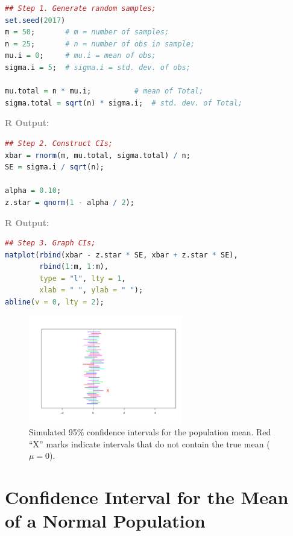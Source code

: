 \begin{lstlisting}[language=R]
## Step 1. Generate random samples;
set.seed(2017)
m = 50;       # m = number of samples;
n = 25;       # n = number of obs in sample;
mu.i = 0;     # mu.i = mean of obs;
sigma.i = 5;  # sigma.i = std. dev. of obs;

mu.total = n * mu.i;          # mean of Total;
sigma.total = sqrt(n) * sigma.i;  # std. dev. of Total;
\end{lstlisting}

\vspace{1em}
\textcolor{gray}{\textbf{R Output:}}

\begin{lstlisting}[language=R]
## Step 2. Construct CIs;
xbar = rnorm(m, mu.total, sigma.total) / n;
SE = sigma.i / sqrt(n);

alpha = 0.10;
z.star = qnorm(1 - alpha / 2);
\end{lstlisting}

\vspace{1em}
\textcolor{gray}{\textbf{R Output:}}

\begin{lstlisting}[language=R]
## Step 3. Graph CIs;
matplot(rbind(xbar - z.star * SE, xbar + z.star * SE),
        rbind(1:m, 1:m),
        type = "l", lty = 1,
        xlab = " ", ylab = " ");
abline(v = 0, lty = 2);
\end{lstlisting}

\begin{figure}[h!]
  \centering
  \includegraphics[width=0.6\textwidth]{Section6/images/confidence_intervals.pdf}
  \caption{Simulated 95\% confidence intervals for the population mean. Red “X” marks indicate intervals that do not contain the true mean (\( \mu = 0 \)).}
\end{figure}


\vspace{2em}

\section*{Confidence Interval for the Mean of a Normal Population}


